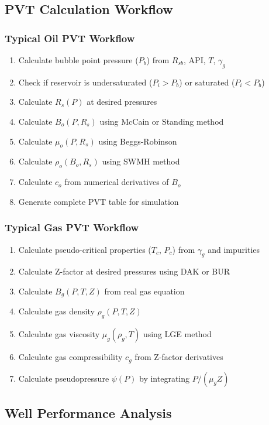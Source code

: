 \documentclass[11pt,a4paper]{article}
\begin{document}
\subsection{PVT Calculation Workflow}

\subsubsection{Typical Oil PVT Workflow}
\begin{enumerate}
\item Calculate bubble point pressure ($P_b$) from $R_{sb}$, API, $T$, $\gamma_g$
\item Check if reservoir is undersaturated ($P_i > P_b$) or saturated ($P_i < P_b$)
\item Calculate $R_s(P)$ at desired pressures
\item Calculate $B_o(P, R_s)$ using McCain or Standing method
\item Calculate $\mu_o(P, R_s)$ using Beggs-Robinson
\item Calculate $\rho_o(B_o, R_s)$ using SWMH method
\item Calculate $c_o$ from numerical derivatives of $B_o$
\item Generate complete PVT table for simulation
\end{enumerate}

\subsubsection{Typical Gas PVT Workflow}
\begin{enumerate}
\item Calculate pseudo-critical properties ($T_c$, $P_c$) from $\gamma_g$ and impurities
\item Calculate Z-factor at desired pressures using DAK or BUR
\item Calculate $B_g(P, T, Z)$ from real gas equation
\item Calculate gas density $\rho_g(P, T, Z)$
\item Calculate gas viscosity $\mu_g(\rho_g, T)$ using LGE method
\item Calculate gas compressibility $c_g$ from Z-factor derivatives
\item Calculate pseudopressure $\psi(P)$ by integrating $P/(\mu_g Z)$
\end{enumerate}

\subsection{Well Performance Analysis}
\end{document}
